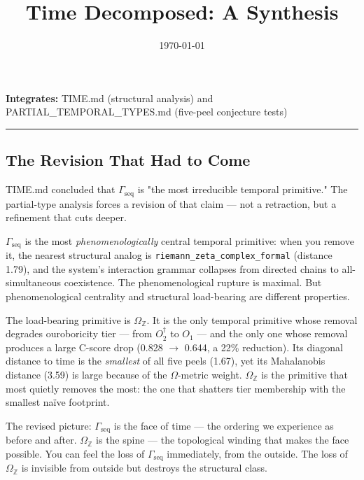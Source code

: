 \documentclass[12pt,a4paper]{article}
\begin{document}
\title{Time Decomposed: A Synthesis}
\date{\today}

\maketitle

\textbf{Integrates:} TIME.md (structural analysis) and PARTIAL\_TEMPORAL\_TYPES.md (five-peel conjecture tests)

\begin{center}
\rule{0.5\textwidth}{0.4pt}
\end{center}

\subsection{The Revision That Had to Come}

TIME.md concluded that $\Gamma_\text{seq}$ is "the most irreducible temporal primitive." The partial-type analysis forces a revision of that claim --- not a retraction, but a refinement that cuts deeper.

$\Gamma_\text{seq}$ is the most \emph{phenomenologically} central temporal primitive: when you remove it, the nearest structural analog is \texttt{riemann\_zeta\_complex\_formal} (distance 1.79), and the system's interaction grammar collapses from directed chains to all-simultaneous coexistence. The phenomenological rupture is maximal. But phenomenological centrality and structural load-bearing are different properties.

The load-bearing primitive is $\Omega_\mathbb{Z}$. It is the only temporal primitive whose removal degrades ouroboricity tier --- from $O_2^\dagger$ to $O_1$ --- and the only one whose removal produces a large C-score drop (0.828 $\rightarrow$ 0.644, a 22\% reduction). Its diagonal distance to time is the \emph{smallest} of all five peels (1.67), yet its Mahalanobis distance (3.59) is large because of the $\Omega$-metric weight. $\Omega_\mathbb{Z}$ is the primitive that most quietly removes the most: the one that shatters tier membership with the smallest naïve footprint.

The revised picture: $\Gamma_\text{seq}$ is the face of time --- the ordering we experience as before and after. $\Omega_\mathbb{Z}$ is the spine --- the topological winding that makes the face possible. You can feel the loss of $\Gamma_\text{seq}$ immediately, from the outside. The loss of $\Omega_\mathbb{Z}$ is invisible from outside but destroys the structural class.
\end{document}
